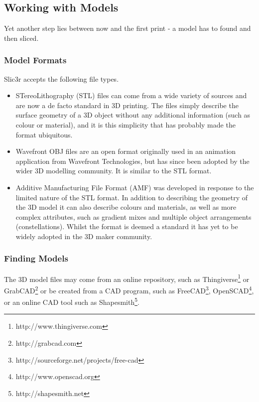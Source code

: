 \subsection{Working with Models}

Yet another step lies between now and the first print - a model has to found and then sliced.

\subsubsection{Model Formats} %
\label{sub:model_formats}

Slic3r accepts the following file types.

\begin{itemize}
	\item STereoLithography (STL) files can come from a wide variety of sources and are now a de facto standard in 3D printing.  The files simply describe the surface geometry of a 3D object without any additional information (such as colour or material), and it is this simplicity that has probably made the format ubiquitous.
	\item Wavefront OBJ files are an open format originally used in an animation application from Wavefront Technologies, but has since been adopted by the wider 3D modelling community.  It is similar to the STL format.
	\item Additive Manufacturing File Format (AMF) was developed in response to the limited nature of the STL format.  In addition to describing the geometry of the 3D model it can also describe colours and materials, as well as more complex attributes, such as gradient mixes and multiple object arrangements (constellations).  Whilst the format is deemed a standard it has yet to be widely adopted in the 3D maker community.
\end{itemize}

\subsubsection{Finding Models} %
\label{sub:working_with_models}
The 3D model files may come from an online repository, such as Thingiverse\footnote{http://www.thingiverse.com} or GrabCAD\footnote{http://grabcad.com} or be created from a CAD program, such as FreeCAD\footnote{http://sourceforge.net/projects/free-cad}, OpenSCAD\footnote{http://www.openscad.org}, or an online CAD tool such as Shapesmith\footnote{http://shapesmith.net}.  

